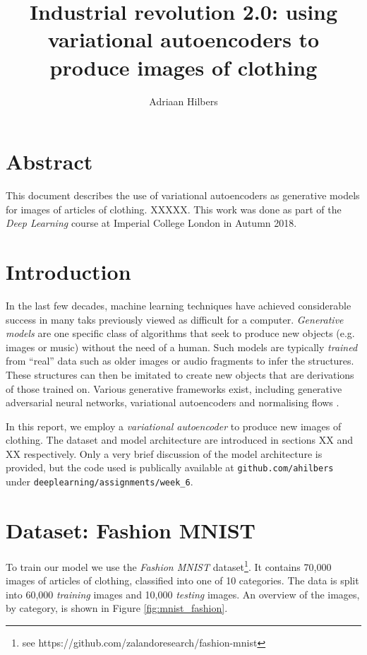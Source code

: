 \documentclass[]{article}
\title{Industrial revolution 2.0: using variational autoencoders to produce images of clothing}
\author{Adriaan Hilbers}
\begin{document}
\maketitle




\section*{Abstract}
\label{sec:abstrct}

This document describes the use of variational autoencoders as generative models for images of articles of clothing. XXXXX.
This work was done as part of the \textit{Deep Learning} course at Imperial College London in Autumn 2018.




\section{Introduction}
\label{sec:introduction}

In the last few decades, machine learning techniques have achieved considerable success in many taks previously viewed as difficult for a computer. \textit{Generative models} are one specific class of algorithms that seek to produce new objects (e.g. images or music) without the need of a human. Such models are typically \textit{trained} from ``real'' data such as older images or audio fragments to infer the structures. These structures can then be imitated to create new objects that are derivations of those trained on. Various generative frameworks exist, including generative adversarial neural networks, variational autoencoders and normalising flows \cite{notes}. 

In this report, we employ a \textit{variational autoencoder} to produce new images of clothing. The dataset and model architecture are introduced in sections XX and XX respectively. Only a very brief discussion of the model architecture is provided, but the code used is publically available at \texttt{github.com/ahilbers} under \texttt{deeplearning/assignments/week\_6}. 




\section{Dataset: Fashion MNIST}
\label{sec:dataset}

To train our model we use the \textit{Fashion MNIST} dataset\footnote{see https://github.com/zalandoresearch/fashion-mnist}. It contains 70,000 images of articles of clothing, classified into one of 10 categories. The data is split into 60,000 \textit{training} images and 10,000 \textit{testing} images. An overview of the images, by category, is shown in Figure \ref{fig:mnist_fashion}.
\end{document}
